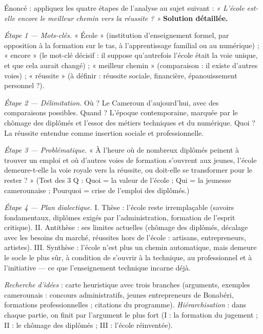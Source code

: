 \documentclass[11pt]{article}
\begin{document}
\begin{exoresolu}
Énoncé : appliquez les quatre étapes de l'analyse au sujet suivant : \emph{« L'école est-elle encore le meilleur chemin vers la réussite ? »}
\tcblower
\textbf{Solution détaillée.}

\emph{Étape 1 — Mots-clés.} « École » (institution d'enseignement formel, par opposition à la formation sur le tas, à l'apprentissage familial ou au numérique) ; « encore » (le mot-clé décisif : il suppose qu'autrefois l'école était la voie unique, et que cela aurait changé) ; « meilleur chemin » (comparaison : il existe d'autres voies) ; « réussite » (à définir : réussite sociale, financière, épanouissement personnel ?).

\emph{Étape 2 — Délimitation.} Où ? Le Cameroun d'aujourd'hui, avec des comparaisons possibles. Quand ? L'époque contemporaine, marquée par le chômage des diplômés et l'essor des métiers techniques et du numérique. Quoi ? La réussite entendue comme insertion sociale et professionnelle.

\emph{Étape 3 — Problématique.} « À l'heure où de nombreux diplômés peinent à trouver un emploi et où d'autres voies de formation s'ouvrent aux jeunes, l'école demeure-t-elle la voie royale vers la réussite, ou doit-elle se transformer pour le rester ? » (Test des 3 Q : Quoi = la valeur de l'école ; Qui = la jeunesse camerounaise ; Pourquoi = crise de l'emploi des diplômés.)

\emph{Étape 4 — Plan dialectique.} I. Thèse : l'école reste irremplaçable (savoirs fondamentaux, diplômes exigés par l'administration, formation de l'esprit critique). II. Antithèse : ses limites actuelles (chômage des diplômés, décalage avec les besoins du marché, réussites hors de l'école : artisans, entrepreneurs, artistes). III. Synthèse : l'école n'est plus un chemin automatique, mais demeure le socle le plus sûr, à condition de s'ouvrir à la technique, au professionnel et à l'initiative — ce que l'enseignement technique incarne déjà.

\emph{Recherche d'idées} : carte heuristique avec trois branches (arguments, exemples camerounais : concours administratifs, jeunes entrepreneurs de Bonabéri, formations professionnelles ; citations du programme). \emph{Hiérarchisation} : dans chaque partie, on finit par l'argument le plus fort (I : la formation du jugement ; II : le chômage des diplômés ; III : l'école réinventée).
\end{exoresolu}
\end{document}
